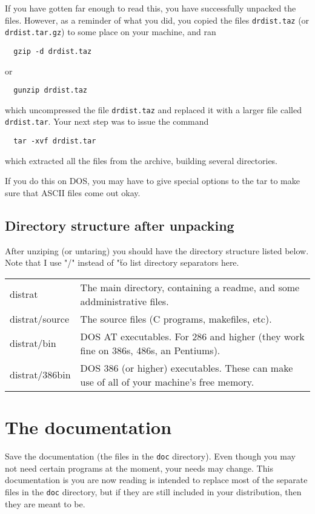 \documentclass[%
	11pt,
        a4paper,
        twoside]{workrep}
\newcommand*{\prg}[1]{\textsf{#1}}		%
\newcommand*{\file}[1]{\texttt{#1}}		%
\begin{document}
If you have gotten far enough to read this, you have successfully
unpacked the files.  However, as a reminder of what you did, you
copied the files \file{drdist.taz} (or \file{drdist.tar.gz}) to
some place on your machine, and ran
\begin{verbatim}
  gzip -d drdist.taz
\end{verbatim}
or
\begin{verbatim}
  gunzip drdist.taz
\end{verbatim}
which uncompressed the file \file{drdist.taz} and replaced it with
a larger file called \file{drdist.tar}.  Your next step was to issue
the command
\begin{verbatim}
  tar -xvf drdist.tar
\end{verbatim}
which extracted all the files from the archive, building several directories.

If you do this on DOS, you may have to give special options to the
\prg{tar} to make sure that ASCII files come out okay.

\subsection{Directory structure after unpacking}

After unziping (or untaring) you should have the directory
structure listed below.  Note that I use "/" instead of "\" to
list directory separators here.
\begin{center}
\begin{tabular}{>{\ttfamily}lp{7.5cm}}
  distrat		& The main directory, containing a readme, and
			  some addministrative files.\\
  distrat/source	& The source files (C programs, makefiles, etc).\\
  distrat/bin		& DOS AT executables.  For 286 and higher (they
			  work fine on 386s, 486s, an Pentiums).\\
  distrat/386bin	& DOS 386 (or higher) executables.  These
			  can make use of all of your machine's free memory.
\end{tabular}
\end{center}

\section{The documentation}

Save the documentation (the files in the \file{doc} directory).
Even though you may not need certain programs at the moment,
your needs may change.  This documentation is you are now
reading is intended to replace most of the separate files in the \file{doc}
directory, but if they are still included in your distribution,
then they are meant to be.
\end{document}
